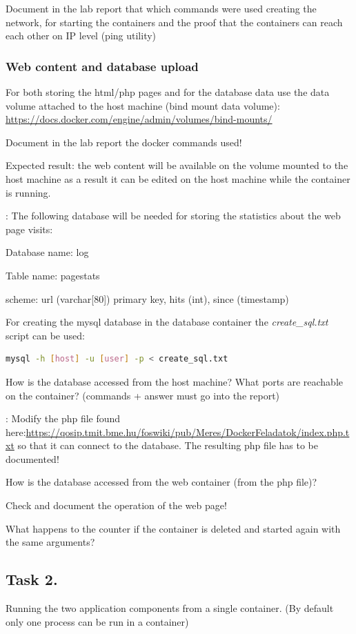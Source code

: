 \documentclass[a4paper]{article}
\begin{document}
Document in the lab report that which commands were used creating the network, for starting the containers and the
proof that the containers can reach each other on IP level (ping utility)

\subsubsection{Web content and database upload}

For both storing the html/php pages and for the database data use the data volume attached to the host machine (bind
mount data volume): \url{https://docs.docker.com/engine/admin/volumes/bind-mounts/}

Document  in the lab report the docker commands used!

Expected result: the web content will be available on the volume mounted to the host machine as a result it can be
edited on the host machine while the container is running.

\textbf{\emph{}}: The following database will be needed for storing the statistics about the web page visits:

Database name: log

Table name: pagestats

scheme:  url (varchar[80]) primary key, hits (int), since (timestamp)

For creating the mysql database in the database container the \emph{create\_sql.txt} script can be used:
\begin{lstlisting}[language=bash,breaklines]
mysql -h [host] -u [user] -p < create_sql.txt
\end{lstlisting}

How is the database accessed from the host machine? What ports are reachable on the container? (commands + answer must
go into the report)

\textbf{\emph{}}:  Modify the php file found
here:\url{https://qosip.tmit.bme.hu/foswiki/pub/Meres/DockerFeladatok/index.php.txt} so that it can connect to the
database. The resulting php file has to be documented!

How is the database accessed from the web container (from the php file)?

Check and document the operation of the web page!

What happens to the counter if the container is deleted and started again with the same arguments?

\subsection{Task 2.}
Running the two application components from a single container. (By default only one process can be run in a container)
\end{document}
